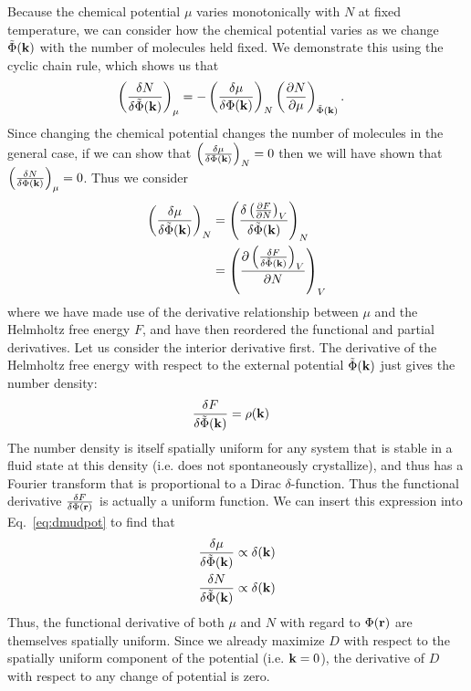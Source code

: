 Because the chemical potential $\mu$ varies monotonically with $N$ at fixed
temperature, we can consider how the chemical potential varies as we change
$\tilde\Phi(\mathbf{k})$ with the number of molecules held fixed. We demonstrate this using the
cyclic chain rule, which shows us that
\begin{align}
    \left(\frac{\delta N}{\delta \tilde\Phi(\mathbf{k})}\right)_{\mu} &=
    -\left(\frac{\delta \mu}{\delta \Phi(\mathbf{k})}\right)_{N}
    \left(\frac{\partial N}{\partial \mu}\right)_{\tilde\Phi(\mathbf{k})}.
\end{align}
Since changing the chemical potential changes the number of molecules in the general case, if we can show that $\left(\frac{\delta \mu}{\delta \Phi(\mathbf{k})}\right)_{N}=0$ then we will have shown that $\left(\frac{\delta N}{\delta \Phi(\mathbf{k})}\right)_{\mu}=0$.  Thus we consider
\begin{align}
    \left(\frac{\delta \mu}{\delta \tilde{\Phi}(\mathbf{k})}\right)_N
    &= \left(\frac{\delta \left(\frac{\partial F}{\partial N}\right)_{V}}{\delta \tilde\Phi(\mathbf{k})}\right)_N
    \\
    &= \left(\frac{\partial \left(\frac{\delta F}{\delta \tilde\Phi(\mathbf{k})}\right)_{V}}{\partial N}\right)_{V}
    \label{eq:dmudpot}
\end{align}
where we have made use of the derivative relationship between $\mu$ and the Helmholtz free energy $F$, and have then reordered the functional and partial derivatives.
Let us consider the interior derivative first.  The derivative of the Helmholtz free energy with respect to the external potential $\tilde\Phi(\mathbf{k})$ just gives the number density:
\begin{align}
    \frac{\delta F}{\delta \tilde\Phi(\mathbf{k})} &= \rho(\mathbf{k})
\end{align}
The number density is itself spatially uniform for any system that is stable in a fluid state at this density (i.e. does not spontaneously crystallize), and thus has a Fourier transform that is proportional to a Dirac $\delta$-function.  Thus the functional derivative $\frac{\delta F}{\delta \Phi(\mathbf{r})}$ is actually a uniform function.
We can insert this expression into Eq.~\ref{eq:dmudpot} to find that
\begin{align}
    \frac{\delta \mu}{\delta \tilde\Phi(\mathbf{k})} &\propto \delta(\mathbf{k}) \\
    \frac{\delta N}{\delta \tilde\Phi(\mathbf{k})} &\propto \delta(\mathbf{k})
\end{align}
Thus, the functional derivative of both $\mu$ and $N$ with regard to $\Phi(\mathbf{r})$ are themselves spatially uniform.  Since we already maximize $D$ with respect to the spatially uniform component of the potential (i.e. $\mathbf{k}=0$), the derivative of $D$ with respect to any change of potential is zero.

